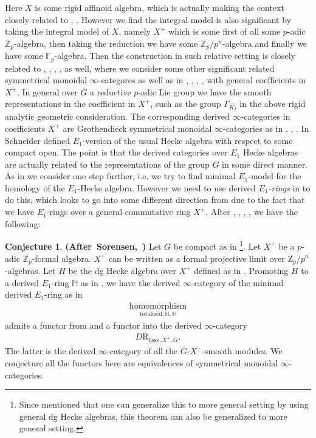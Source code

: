 \documentclass[12pt]{article}
\theoremstyle{definition}
\newtheorem{conjecture}{Conjecture}
\begin{document}
\indent Here $X$ is some rigid affinoid algebra, which is actually making the context closely related to \cite{Z1}, \cite{ST}. However we find the integral model is also significant by taking the integral model of $X$, namely $X^+$ which is some first of all some $p$-adic $\mathbb{Z}_p$-algebra, then taking the reduction we have some $\mathbb{Z}_p/p^n$-algebra and finally we have some $\mathbb{F}_p$-algebra. Then the construction in such relative setting is closely related to \cite{Sc1}, \cite{So1}, \cite{SS1}, \cite{SS2}, \cite{HM} as well, where we consider some other significant related symmetrical monoidal $\infty$-categores as well as in \cite{Sc1}, \cite{So1}, \cite{SS1}, \cite{SS2}, \cite{HM} with general coefficients in $X^+$. In general over $G$ a reductive $p$-adic Lie group we have the smooth representations in the coefficient in $X^+$, such as the group $\Gamma_{K_I}$ in the above rigid analytic geometric consideration. The corresponding derived $\infty$-categories in coefficients $X^+$ are  Grothendieck symmetrical monoidal $\infty$-categories as in \cite{SS1}, \cite{SS2}, \cite{HM}. In \cite{Sc1} Schneider defined $E_1$-version of the usual Hecke algebra with respect to some compact open. The point is that the derived categories over $E_1$ Hecke algebras are actually related to the representations of the group $G$ in some direct manner. As in \cite{So1} we consider one step further, i.e. we try to find minimal $E_1$-model for the homology of the $E_1$-Hecke algebra. However we need to use derived \textit{$E_1$-rings} in \cite{Sa} to do this, which looks to go into some different direction from \cite{So1} due to the fact that we have $E_1$-rings over a general commutative ring $X^+$. After \cite{Sc1}, \cite{So1}, \cite{SS1}, \cite{SS2}, \cite{HM} we have the following:


\begin{conjecture}\mbox{\textbf{(After Sorensen, \cite[Theorem 1.1]{So1})}}
Let $G$ be compact as in \cite{So1}\footnote{Since \cite{So1} mentioned that one can generalize this to more general setting by using general dg Hecke algebras, this theorem can also be generalized to more general setting.}. Let $X^+$ be a $p$-adic $\mathbb{Z}_p$-formal algebra. $X^+$ can be written as a formal projective limit over $\mathrm{Z}_p/p^n$-algebras. Let $H$ be the dg Hecke algebra over $X^+$ defined as in \cite{Sc1}. Promoting $H$ to a derived $E_1$-ring $\mathbb{H}$ as in \cite{Sa}, we have the derived $\infty$-category of the minimal derived $E_1$-ring as in \cite[Theorem 1.2]{Sa}
\begin{align}
\underset{{\mathrm{totalized},\mathbb{H},\mathbb{H}}}{\mathrm{homomorphism}}
\end{align}
admits a functor from and a functor into the derived $\infty$-category
\begin{align}
D\mathrm{R}_{\mathrm{lisse},X^+,G}.
\end{align}
The latter is the derived $\infty$-category of all the $G$-$X^+$-smooth modules. We conjecture all the functors here are equivalences of symmetrical monoidal $\infty$-categories.
\end{conjecture}
\end{document}
